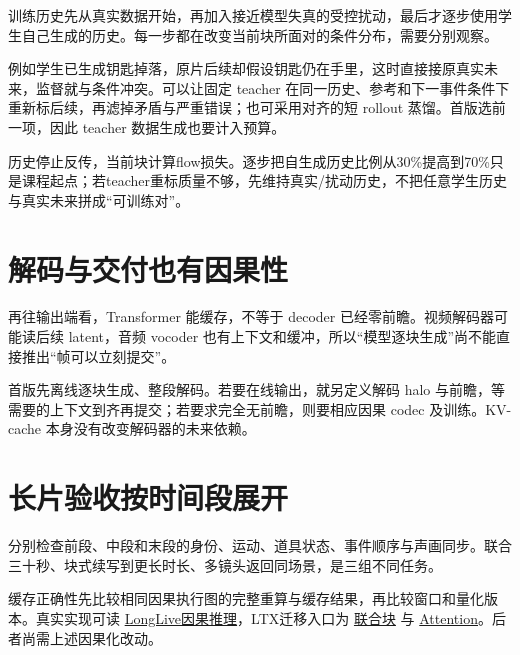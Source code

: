 训练历史先从真实数据开始，再加入接近模型失真的受控扰动，最后才逐步使用学生自己生成的历史。每一步都在改变当前块所面对的条件分布，需要分别观察。

例如学生已生成钥匙掉落，原片后续却假设钥匙仍在手里，这时直接接原真实未来，监督就与条件冲突。可以让固定 teacher 在同一历史、参考和下一事件条件下重新标后续，再滤掉矛盾与严重错误；也可采用对齐的短 rollout 蒸馏。首版选前一项，因此 teacher 数据生成也要计入预算。

历史停止反传，当前块计算flow损失。逐步把自生成历史比例从30\%提高到70\%只是课程起点；若teacher重标质量不够，先维持真实/扰动历史，不把任意学生历史与真实未来拼成``可训练对''。

\section{解码与交付也有因果性}\label{seedance-m24-ux89e3ux7801ux4e0eux4ea4ux4ed8ux4e5fux6709ux56e0ux679cux6027}

再往输出端看，Transformer 能缓存，不等于 decoder 已经零前瞻。视频解码器可能读后续 latent，音频 vocoder 也有上下文和缓冲，所以“模型逐块生成”尚不能直接推出“帧可以立刻提交”。

首版先离线逐块生成、整段解码。若要在线输出，就另定义解码 halo 与前瞻，等需要的上下文到齐再提交；若要求完全无前瞻，则要相应因果 codec 及训练。KV-cache 本身没有改变解码器的未来依赖。

\section{长片验收按时间段展开}\label{seedance-m24-ux957fux7247ux9a8cux6536ux6309ux65f6ux95f4ux6bb5ux5c55ux5f00}

分别检查前段、中段和末段的身份、运动、道具状态、事件顺序与声画同步。联合三十秒、块式续写到更长时长、多镜头返回同场景，是三组不同任务。

缓存正确性先比较相同因果执行图的完整重算与缓存结果，再比较窗口和量化版本。真实实现可读 \href{https://github.com/NVlabs/LongLive/blob/31c70d9071cd7851d82939806dc9fac645fcabe5/LongLive1.0/pipeline/causal_inference.py}{LongLive因果推理}，LTX迁移入口为 \href{https://github.com/Lightricks/LTX-2/blob/bd92a5f408eb8c99f8c05e9fe2fcaaec8b56b638/packages/ltx-core/src/ltx_core/model/transformer/transformer.py}{联合块} 与 \href{https://github.com/Lightricks/LTX-2/blob/bd92a5f408eb8c99f8c05e9fe2fcaaec8b56b638/packages/ltx-core/src/ltx_core/model/transformer/attention.py}{Attention}。后者尚需上述因果化改动。
